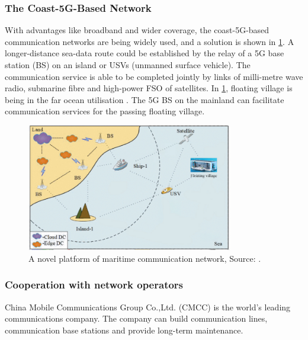 \documentclass[11pt]{article}
\numberwithin{equation}{section}
\begin{document}
\subsubsection{The Coast-5G-Based Network}
\label{sec:org44261b9}
With advantages like broadband and wider coverage, the coast-5G-based communication networks are being widely used, and a solution is shown in \ref{A_novel_platform_of_maritime_communication_network}. A longer-distance sea-data route could be established by the relay of a 5G base station (BS) on an island or USVs (unmanned surface vehicle). The communication service is able to be completed jointly by links of milli-metre wave radio, submarine fibre and high-power FSO of satellites.  In \ref{A_novel_platform_of_maritime_communication_network}, floating village is being in the far ocean utilisation \cite{10.1109/ISPA-BDCloud-SocialCom-SustainCom51426.2020.00190}. The 5G BS on the mainland can facilitate communication services for the passing floating village.

\begin{figure}[H]
\centering
\includegraphics[width=0.8\textwidth]{Figures/A_novel_platform_of_maritime_communication_network.jpg}
\caption{\label{A_novel_platform_of_maritime_communication_network}A novel platform of maritime communication network, Source: \cite{10.1109/ISPA-BDCloud-SocialCom-SustainCom51426.2020.00190}.}
\end{figure}


\subsubsection{Cooperation with network operators}
\label{sec:org9ae04a1}
China Mobile Communications Group Co.,Ltd. (CMCC) is the world's leading communications company. The company can build communication lines, communication base stations and provide long-term maintenance.
\end{document}
